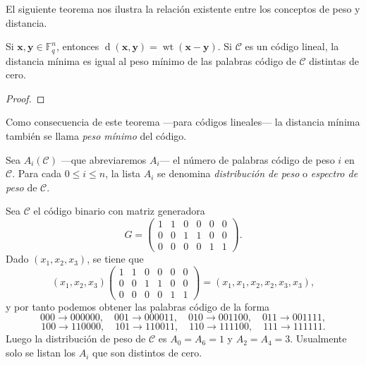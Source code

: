 El siguiente teorema nos ilustra la relación existente entre los conceptos de peso y distancia.

\begin{theorem}
  Si \(\symbf{x}, \symbf{y} \in \mathbb F_q^n\), entonces \(\operatorname{d}(\symbf{x}, \symbf{y}) = \operatorname{wt}(\symbf{x} - \symbf{y})\).
  Si \(\mathcal C\) es un código lineal, la distancia mínima es igual al peso mínimo de las palabras código de \(\mathcal C\) distintas de cero.
\end{theorem}

\begin{proof}
  
\end{proof}

Como consecuencia de este teorema —para códigos lineales— la distancia mínima también se llama \textit{peso mínimo} del código.

\begin{definition}
  Sea \(A_i(\mathcal C)\) —que abreviaremos \(A_i\)— el número de palabras código de peso \(i\) en \(\mathcal C\).
  Para cada \(0 \leq i \leq n\), la lista \(A_i\) se denomina \textit{distribución de peso} o \textit{espectro de peso} de \(\mathcal C\).
\end{definition}

\begin{example}
  Sea \(\mathcal C\) el código binario con matriz generadora
  \[
    G = \begin{pmatrix}
      1 & 1 & 0 & 0 & 0 & 0\\
      0 & 0 & 1 & 1 & 0 & 0 \\
      0 & 0 & 0 & 0 & 1 & 1
    \end{pmatrix}.
  \]
  Dado \((x_1, x_2, x_3)\), se tiene que \[(x_1, x_2, x_3) \begin{pmatrix}
    1 & 1 & 0 & 0 & 0 & 0\\
      0 & 0 & 1 & 1 & 0 & 0 \\
      0 & 0 & 0 & 0 & 1 & 1
  \end{pmatrix} = (x_1, x_1, x_2, x_2, x_3, x_3),\] y por tanto podemos obtener las palabras código de la forma 
  \[
    000 \to 000000, \!\quad 
    001 \to 000011,\!\quad 
    010 \to 001100,\!\quad 
    011 \to 001111,
  \]
  \[
    100 \to 110000, \!\quad 
    101 \to 110011,\!\quad 
    110 \to 111100,\!\quad 
    111 \to 111111.
  \]
  Luego la distribución de peso de \(\mathcal C\) es \(A_0 = A_6 = 1\) y \(A_2 = A_4 = 3\).
  Usualmente solo se listan los \(A_i\) que son distintos de cero.
\end{example}

